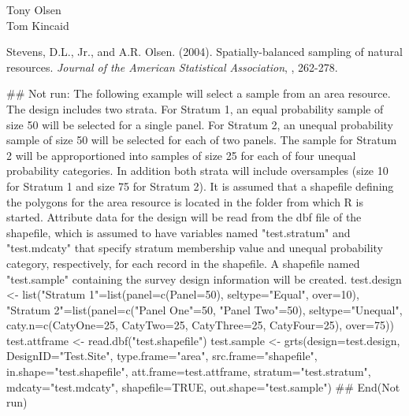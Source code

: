 \begin{Author}\relax
Tony Olsen \\
Tom Kincaid 
\end{Author}
\begin{References}\relax
Stevens, D.L., Jr., and A.R. Olsen. (2004). Spatially-balanced sampling of
natural resources. \emph{Journal of the American Statistical Association}, ,
262-278.
\end{References}
\begin{SeeAlso}\relax
{}
\end{SeeAlso}
\begin{Examples}
\begin{ExampleCode}
## Not run: 
The following example will select a sample from an area resource.  The design
includes two strata.  For Stratum 1, an equal probability sample of size 50
will be selected for a single panel.  For Stratum 2, an unequal probability
sample of size 50 will be selected for each of two panels.  The sample for
Stratum 2 will be approportioned into samples of size 25 for each of four
unequal probability categories.  In addition both strata will include
oversamples (size 10 for Stratum 1 and size 75 for Stratum 2).  It is assumed
that a shapefile defining the polygons for the area resource is located in the
folder from which R is started.  Attribute data for the design will be read
from the dbf file of the shapefile, which is assumed to have variables named
"test.stratum" and "test.mdcaty" that specify stratum membership value and
unequal probability category, respectively, for each record in the shapefile.
A shapefile named "test.sample" containing the survey design information will
be created.
test.design <- list("Stratum 1"=list(panel=c(Panel=50), seltype="Equal",
   over=10), "Stratum 2"=list(panel=c("Panel One"=50, "Panel Two"=50),
   seltype="Unequal", caty.n=c(CatyOne=25, CatyTwo=25, CatyThree=25,
   CatyFour=25), over=75))
test.attframe <- read.dbf("test.shapefile")
test.sample <- grts(design=test.design, DesignID="Test.Site", type.frame="area",
   src.frame="shapefile", in.shape="test.shapefile", att.frame=test.attframe,
   stratum="test.stratum", mdcaty="test.mdcaty", shapefile=TRUE,
   out.shape="test.sample")
## End(Not run)
\end{ExampleCode}
\end{Examples}

